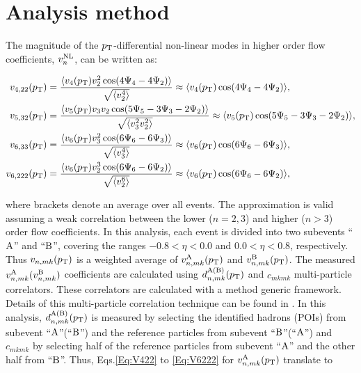 \section{Analysis method}
\label{Sec:Analysis method}

The magnitude of the $p_{\rm{T}}$-differential non-linear modes in higher order flow coefficients, $v_{n}^{\rm{NL}}$, can be written as: 

\begin{align}
v_{4,22}(p_{\rm{T}})&= \frac{\langle v_{4}(p_{\rm{T}})v_{2}^{2}\cos(4\Psi_{4}-4\Psi_{2})\rangle}{\sqrt{\langle v_{2}^{4}\rangle}} \approx \langle v_{4}(p_{\rm{T}})\cos(4\Psi_{4}-4\Psi_{2})\rangle, \label{Eq:V422}\\
v_{5,32}(p_{\rm{T}})&= \frac{\langle v_{5}(p_{\rm{T}})v_{3}v_{2}\cos(5\Psi_{5}-3\Psi_{3}-2\Psi_{2})\rangle}{\sqrt{\langle v_{3}^{2}v_{2}^{2}\rangle}} \approx \langle v_{5}(p_{\rm{T}})\cos(5\Psi_{5}-3\Psi_{3}-2\Psi_{2})\rangle, \label{Eq:V532}\\
v_{6,33}(p_{\rm{T}}) &= \frac{\langle v_{6}(p_{\rm{T}})v_{3}^{2}\cos(6\Psi_{6}-6\Psi_{3})\rangle}{\sqrt{\langle v_{3}^{4}\rangle}} \approx \langle v_{6}(p_{\rm{T}})\cos(6\Psi_{6}-6\Psi_{3})\rangle , \label{Eq:V633}\\
v_{6,222}(p_{\rm{T}}) &= \frac{\langle v_{6}(p_{\rm{T}})v_{2}^{3}\cos(6\Psi_{6}-6\Psi_{2})\rangle}{\sqrt{\langle v_{2}^{6}\rangle}} \approx \langle v_{6}(p_{\rm{T}})\cos(6\Psi_{6}-6\Psi_{2})\rangle,
\label{Eq:V6222}
\end{align}

\noindent where brackets denote an average over all events. The approximation is valid assuming a weak correlation between the lower ($n=2,3$) and higher ($n>3$) order flow coefficients. In this analysis, each event is divided into two subevents ``$\rm{A}$'' and ``$\rm{B}$'', covering the ranges $-0.8< \eta < 0.0$ and $0.0 <\eta< 0.8$, respectively. Thus $v_{n,mk}(p_{\rm{T}})$ is a weighted average of $v_{n,mk}^{\rm{A}}(p_{\rm{T}})$ and $v_{n,mk}^{\rm{B}}(p_{\rm{T}})$. The measured $v_{n,mk}^{\rm{A}} (v_{n,mk}^{\rm{B}})$ coefficients are calculated using $d^{\rm{A(B)}}_{n,mk}(p_{\rm{T}})$ and $c_{mkmk}$ multi-particle correlators. These correlators are calculated with a method generic framework. Details of this multi-particle correlation technique can be found in \cite{Bilandzic:2013kga}. In this analysis, $d^{\rm{A(B)}}_{n,mk}(p_{\rm{T}})$ is measured by selecting the identified hadrons (POIs) from subevent ``$\rm{A}$''(``$\rm{B}$'') and the reference particles from subevent ``$\rm{B}$''(``$\rm{A}$'') and $c_{mkmk}$ by selecting half of the reference particles from subevent ``$\rm{A}$'' and the other half from ``$\rm{B}$''. Thus, Eqs.\ref{Eq:V422} to \ref{Eq:V6222} for $v_{n,mk}^{\rm{A}}(p_{\rm{T}})$ translate to

